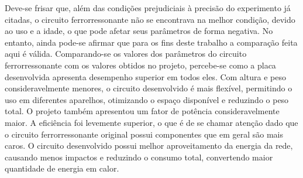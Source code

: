 Deve-se frisar que, além das condições prejudiciais à precisão do experimento já citadas, o circuito ferrorressonante não se encontrava na melhor condição, devido ao uso e a idade, o que pode afetar seus parâmetros de forma negativa. No entanto, ainda pode-se afirmar que para os fins deste trabalho a comparação feita aqui é válida. Comparando-se os valores dos parâmetros do circuito ferrorressonante com os valores obtidos no projeto, percebe-se como a placa desenvolvida apresenta desempenho superior em todos eles. Com altura e peso consideravelmente menores, o circuito desenvolvido é mais flexível, permitindo o uso em diferentes aparelhos, otimizando o espaço disponível e reduzindo o peso total. O projeto também apresentou um fator de potência consideravelmente maior. A eficiência foi levemente superior, o que é de se chamar atenção dado que o circuito ferrorressonante original possui componentes que em geral são mais caros. O circuito desenvolvido possui melhor aproveitamento da energia da rede, causando menos impactos e reduzindo o consumo total, convertendo maior quantidade de energia em calor.
